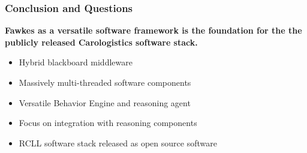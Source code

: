 \begin{frame}
  \frametitle{Conclusion and Questions}

  \begin{block}{}
    \centering\bfseries
    Fawkes as a versatile software framework is the foundation for the
    the publicly released Carologistics software stack.
  \end{block}

  \bigskip


  \begin{itemize}
  \item Hybrid blackboard middleware
  \item Massively multi-threaded software components
  \item Versatile Behavior Engine and reasoning agent
  \item Focus on integration with reasoning components
  \item RCLL software stack released as open source software
  \end{itemize}

  \bigskip

\end{frame}

